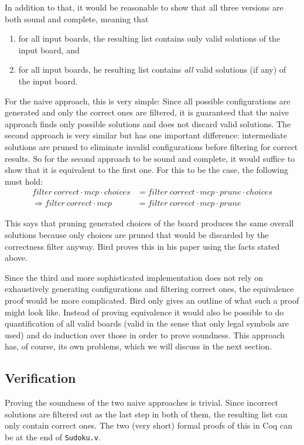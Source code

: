 \documentclass[a4paper,11pt]{article}
\begin{document}
In addition to that, it would be reasonable to show that all three versions are both sound and complete, meaning that
\begin{enumerate}
  \item for all input boards, the resulting list contains only valid solutions of the input board, and
  \item for all input boards, he resulting list contains \emph{all} valid solutions (if any) of the input board.
\end{enumerate}

For the naive approach, this is very simple: Since all possible configurations are generated and only the correct ones are filtered, it is guaranteed that the naive approach finds only possible solutions and does not discard valid solutions. The second approach is very similar but has one important difference: intermediate solutions are pruned to eliminate invalid configurations before filtering for correct results. So for the second approach to be sound and complete, it would suffice to show that it is equivalent to the first one. For this to be the case, the following must hold:
\begin{align*}
  filter~correct \cdot mcp \cdot choices &= filter~correct \cdot mcp \cdot prune \cdot choices\\
  \Rightarrow filter~correct \cdot mcp &= filter~correct \cdot mcp \cdot prune
\end{align*}

This says that pruning generated choices of the board produces the same overall solutions because only choices are pruned that would be discarded by the correctness filter anyway. Bird proves this in his paper using the facts stated above.


Since the third and more sophisticated implementation does not rely on exhaustively generating configurations and filtering correct ones, the equivalence proof would be more complicated. Bird only gives an outline of what such a proof might look like. Instead of proving equivalence it would also be possible to do quantification of all valid boards (valid in the sense that only legal symbols are used) and do induction over those in order to prove soundness. This approach has, of course, its own problems, which we will discuss in the next section.


\subsection{Verification}
Proving the soundness of the two naive approaches is trivial. Since incorrect solutions are filtered out as the last step in both of them, the resulting list can only contain correct ones. The two (very short) formal proofs of this in Coq can be  at the end of \texttt{Sudoku.v}.
\end{document}
